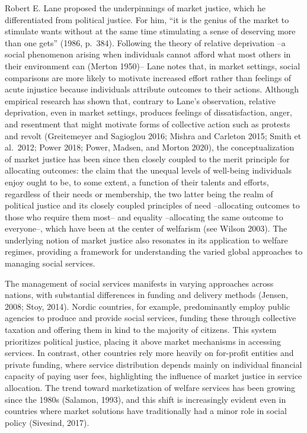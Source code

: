 \documentclass[
  letterpaper,
  DIV=11,
  numbers=noendperiod]{scrartcl}
\begin{document}
Robert E. Lane proposed the underpinnings of market justice, which he
differentiated from political justice. For him, ``it is the genius of
the market to stimulate wants without at the same time stimulating a
sense of deserving more than one gets'' (1986, p.~384). Following the
theory of relative deprivation --a social phenomenon arising when
individuals cannot afford what most others in their environment can
(Merton 1950)-- Lane notes that, in market settings, social comparisons
are more likely to motivate increased effort rather than feelings of
acute injustice because individuals attribute outcomes to their actions.
Although empirical research has shown that, contrary to Lane's
observation, relative deprivation, even in market settings, produces
feelings of dissatisfaction, anger, and resentment that might motivate
forms of collective action such as protests and revolt (Greitemeyer and
Sagioglou 2016; Mishra and Carleton 2015; Smith et al.~2012; Power 2018;
Power, Madsen, and Morton 2020), the conceptualization of market justice
has been since then closely coupled to the merit principle for
allocating outcomes: the claim that the unequal levels of well-being
individuals enjoy ought to be, to some extent, a function of their
talents and efforts, regardless of their needs or membership, the two
latter being the realm of political justice and its closely coupled
principles of need --allocating outcomes to those who require them
most-- and equality --allocating the same outcome to everyone--, which
have been at the center of welfarism (see Wilson 2003). The underlying
notion of market justice also resonates in its application to welfare
regimes, providing a framework for understanding the varied global
approaches to managing social services.

The management of social services manifests in varying approaches across
nations, with substantial differences in funding and delivery methods
(Jensen, 2008; Stoy, 2014). Nordic countries, for example, predominantly
employ public agencies to produce and provide social services, funding
these through collective taxation and offering them in kind to the
majority of citizens. This system prioritizes political justice, placing
it above market mechanisms in accessing services. In contrast, other
countries rely more heavily on for-profit entities and private funding,
where service distribution depends mainly on individual financial
capacity of paying user fees, highlighting the influence of market
justice in service allocation. The trend toward marketization of welfare
services has been growing since the 1980s (Salamon, 1993), and this
shift is increasingly evident even in countries where market solutions
have traditionally had a minor role in social policy (Sivesind, 2017).
\end{document}
